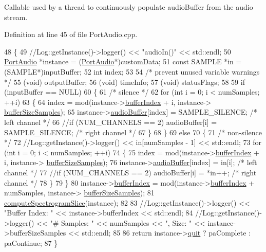 Callable used by a thread to continuously populate audio\+Buffer from the audio stream. 

Definition at line 45 of file Port\+Audio.\+cpp.


\begin{DoxyCode}
48 \{
49     \textcolor{comment}{//Log::getInstance()->logger() << "audioIn()" << std::endl;}
50     \mbox{\hyperlink{classPortAudio}{PortAudio}} *instance = (\mbox{\hyperlink{classPortAudio}{PortAudio}}*)customData;
51     \textcolor{keyword}{const} SAMPLE *in = (SAMPLE*)inputBuffer;
52     \textcolor{keywordtype}{int} index;
53     
54     \textcolor{comment}{/* prevent unused variable warnings */}
55     (void) outputBuffer;
56     (void) timeInfo;
57     (void) statusFlags;
58     
59     \textcolor{keywordflow}{if} (inputBuffer == NULL)
60     \{
61         \textcolor{comment}{/* silence */}
62         \textcolor{keywordflow}{for} (\textcolor{keywordtype}{int} i = 0; i < numSamples; ++i)
63         \{
64             index = mod(instance->\mbox{\hyperlink{classAudioInput_a3c9888a90ca8bc6b42257f3f11ee9a6e}{bufferIndex}} + i, instance->
      \mbox{\hyperlink{classAudioInput_a4e213a9a22a62dccc3a54369101559c7}{bufferSizeSamples}});
65             instance->\mbox{\hyperlink{classAudioInput_a797943485896a381ea80947c8b6a8488}{audioBuffer}}[index] = SAMPLE\_SILENCE; \textcolor{comment}{/* left channel */}
66             \textcolor{comment}{//if (NUM\_CHANNELS == 2) audioBuffer[i] = SAMPLE\_SILENCE; /* right channel */}
67         \}
68     \}
69     \textcolor{keywordflow}{else}
70     \{
71         \textcolor{comment}{/* non-silence */}
72         \textcolor{comment}{//Log::getInstance()->logger() << in[numSamples - 1] << std::endl;}
73         \textcolor{keywordflow}{for} (\textcolor{keywordtype}{int} i = 0; i < numSamples; ++i)
74         \{
75             index = mod(instance->\mbox{\hyperlink{classAudioInput_a3c9888a90ca8bc6b42257f3f11ee9a6e}{bufferIndex}} + i, instance->
      \mbox{\hyperlink{classAudioInput_a4e213a9a22a62dccc3a54369101559c7}{bufferSizeSamples}});
76             instance->\mbox{\hyperlink{classAudioInput_a797943485896a381ea80947c8b6a8488}{audioBuffer}}[index] = in[i]; \textcolor{comment}{/* left channel */}
77             \textcolor{comment}{//if (NUM\_CHANNELS == 2) audioBuffer[i] = *in++; /* right channel */}
78         \}
79     \}
80     instance->\mbox{\hyperlink{classAudioInput_a3c9888a90ca8bc6b42257f3f11ee9a6e}{bufferIndex}} = mod(instance->\mbox{\hyperlink{classAudioInput_a3c9888a90ca8bc6b42257f3f11ee9a6e}{bufferIndex}} + numSamples, instance->
      \mbox{\hyperlink{classAudioInput_a4e213a9a22a62dccc3a54369101559c7}{bufferSizeSamples}});
81     \mbox{\hyperlink{classAudioInput_a77614769e39be88bbf5d78adf84d9260}{computeSpectrogramSlice}}(instance);
82     
83     \textcolor{comment}{//Log::getInstance()->logger() << "Buffer Index: " << instance->bufferIndex << std::endl;}
84     \textcolor{comment}{//Log::getInstance()->logger() << "# Samples: " << numSamples << ", Size: " <<
       instance->bufferSizeSamples << std::endl;}
85     
86     \textcolor{keywordflow}{return} instance->\mbox{\hyperlink{classAudioInput_aceef1c12e4f78624ed695371adf495df}{quit}} ? paComplete : paContinue;
87 \}
\end{DoxyCode}

